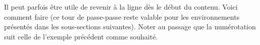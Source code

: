 

\begin{bdoctip}
	Il peut parfois être utile de revenir à la ligne dès le début du contenu. Voici comment faire (ce tour de passe-passe reste valable pour les environnements présentés dans les sous-sections suivantes). Noter au passage que la numérotation suit celle de l'exemple précédent comme souhaité.

\end{bdoctip}


